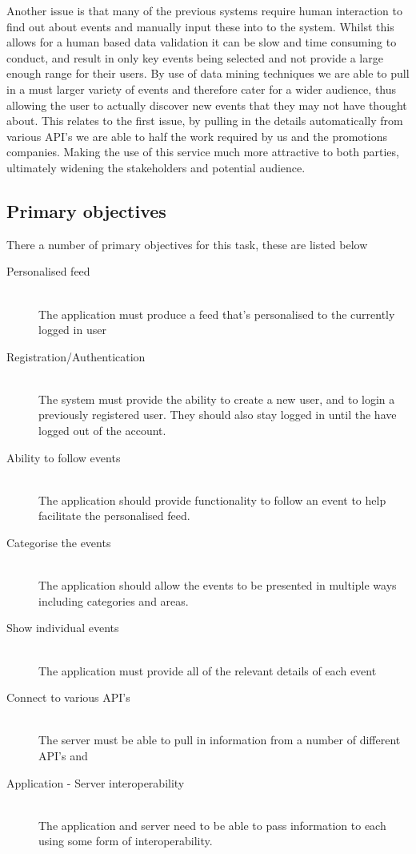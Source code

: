 	Another issue is that many of the previous systems require human interaction to find out about events and manually input these into to the system. Whilst this allows for a human based data validation it can be slow and time consuming to conduct, and result in only key events being selected and not provide a large enough range for their users. By use of data mining techniques we are able to pull in a must larger variety of events and therefore cater for a wider audience, thus allowing the user to actually discover new events that they may not have thought about. This relates to the first issue, by pulling in the details automatically from various API's we are able to half the work required by us and the promotions companies. Making the use of this service much more attractive to both parties, ultimately widening the stakeholders and potential audience. 		

	\subsection{Primary objectives}
		
		There a number of primary objectives for this task, these are listed below

		\begin{description}
			\item[Personalised feed] \hfill \\
				The application must produce a feed that's personalised to the currently logged in user
			\item[Registration/Authentication] \hfill \\
				The system must provide the ability to create a new user, and to login a previously registered user. They should also stay logged in until the have logged out of the account.
			\item[Ability to follow events] \hfill \\
				The application should provide functionality to follow an event to help facilitate the personalised feed. 
			\item[Categorise the events] \hfill \\
				The application should allow the events to be presented in multiple ways including categories and areas. 
			\item[Show individual events] \hfill \\
				The application must provide all of the relevant details of each event
			\item[Connect to various API's] \hfill \\
				The server must be able to pull in information from a number of different API's and 
			\item[Application - Server interoperability] \hfill \\
				The application and server need to be able to pass information to each using some form of interoperability. 
		\end{description}

